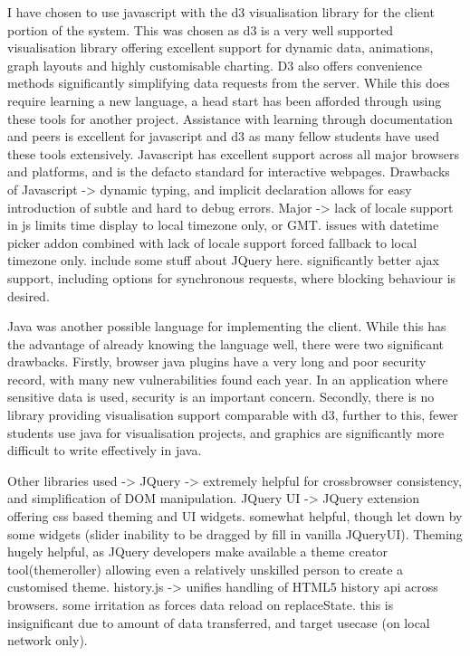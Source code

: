 I have chosen to use javascript with the d3 visualisation library \cite{bostock2011d3} for the client portion of the system. This was chosen as d3 is a very well supported visualisation library offering excellent support for dynamic data, animations, graph layouts and highly customisable charting. D3 also offers convenience methods significantly simplifying data requests from the server. While this does require learning a new language, a head start has been afforded through using these tools for another project. Assistance with learning through documentation and peers is excellent for javascript and d3 as many fellow students have used these tools extensively.  Javascript has excellent support across all major browsers and platforms, and is the defacto standard for interactive webpages. Drawbacks of Javascript -> dynamic typing, and implicit declaration allows for easy introduction of subtle and hard to debug errors. Major -> lack of locale support in js limits time display to local timezone only, or GMT. issues with datetime picker addon combined with lack of locale support forced fallback to local timezone only. include some stuff about JQuery here. significantly better ajax support, including options for synchronous requests, where blocking behaviour is desired.

Java was another possible language for implementing the client. While this has the advantage of already knowing the language well, there were two significant drawbacks. Firstly, browser java plugins have a very long and poor security record, with many new vulnerabilities found each year. In an application where sensitive data is used, security is an important concern. Secondly, there is no library providing visualisation support comparable with d3, further to this, fewer students use java for visualisation projects, and graphics are significantly more difficult to write effectively in java. 

Other libraries used -> 
JQuery -> extremely helpful for crossbrowser consistency, and simplification of DOM manipulation.
JQuery UI -> JQuery extension offering css based theming and UI widgets. somewhat helpful, though let down by some widgets (slider inability to be dragged by fill in vanilla JQueryUI). Theming hugely helpful, as JQuery developers make available a theme creator tool(themeroller) allowing even a relatively unskilled person to create a customised theme.
history.js -> unifies handling of HTML5 history api across browsers. some irritation as forces data reload on replaceState. this is insignificant due to amount of data transferred, and target usecase (on local network only).

